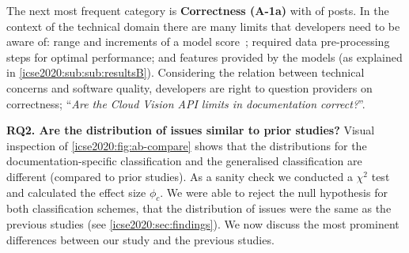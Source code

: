 The next most frequent category is \textbf{Correctness (A-1a)} with \PctTaxACorrectness{} of posts. In the context of the technical domain there are many limits that developers need to be aware of: range and increments of a model score~\citep{Cummaudo:2019icsme}; required data pre-processing steps for optimal performance; and features provided by the models (as explained in \cref{icse2020:sub:sub:resultsB}). Considering the relation between technical concerns and software quality, developers are right to question providers on correctness; ``\textit{Are the Cloud Vision API limits in documentation correct?}''. 

\smallskip
\noindent
\textbf{RQ2. Are the distribution of issues similar to prior studies?}
Visual inspection of \cref{icse2020:fig:ab-compare} shows that the distributions for the documentation-specific classification and the generalised classification are different (compared to prior studies). As a sanity check we conducted a $\chi^2$ test and calculated the effect size $\phi_c$. We were able to reject the null hypothesis for both classification schemes, that the distribution of issues were the same as the previous studies (see \cref{icse2020:sec:findings}). We now discuss the most prominent differences between our study and the previous studies. 



